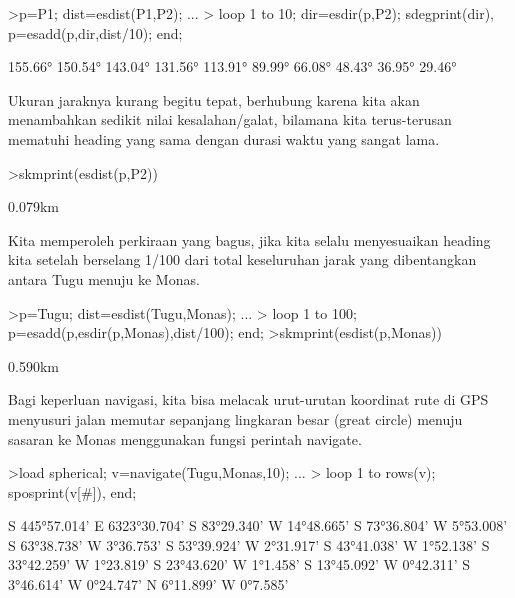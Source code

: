 \documentclass[a4paper,11pt,oneside,enabledeprecatedfontcommands]{scrbook}
\newenvironment{eulernotebook}{}{}
\newenvironment{eulercomment}{\par\medskip\noindent}{\par\medskip}
\begin{document}
\begin{eulernotebook}
\begin{eulerprompt}
\begin{eulercomment}
\end{eulercomment}
\begin{eulerprompt}
>p=P1;  dist=esdist(P1,P2); ...
>  loop 1 to 10; dir=esdir(p,P2); sdegprint(dir), p=esadd(p,dir,dist/10); end;
\end{eulerprompt}
\begin{euleroutput}
155.66°
150.54°
143.04°
131.56°
113.91°
 89.99°
 66.08°
 48.43°
 36.95°
 29.46°
\end{euleroutput}
\begin{eulercomment}
Ukuran jaraknya kurang begitu tepat, berhubung karena kita akan menambahkan sedikit nilai kesalahan/galat,
bilamana kita terus-terusan mematuhi heading yang sama dengan durasi waktu yang sangat lama.
\end{eulercomment}
\begin{eulerprompt}
>skmprint(esdist(p,P2))
\end{eulerprompt}
\begin{euleroutput}
0.079km
\end{euleroutput}
\begin{eulercomment}
Kita memperoleh perkiraan yang bagus, jika kita selalu menyesuaikan heading kita setelah berselang 1/100 dari total keseluruhan jarak
yang dibentangkan antara Tugu menuju ke Monas.
\end{eulercomment}
\begin{eulerprompt}
>p=Tugu; dist=esdist(Tugu,Monas); ...
>  loop 1 to 100; p=esadd(p,esdir(p,Monas),dist/100); end;
>skmprint(esdist(p,Monas))
\end{eulerprompt}
\begin{euleroutput}
0.590km
\end{euleroutput}
\begin{eulercomment}
Bagi keperluan navigasi, kita bisa melacak urut-urutan koordinat rute di GPS menyusuri jalan memutar sepanjang lingkaran besar (great circle)
menuju sasaran ke Monas menggunakan fungsi perintah navigate.
\end{eulercomment}
\begin{eulerprompt}
>load spherical; v=navigate(Tugu,Monas,10); ...
>  loop 1 to rows(v); sposprint(v[#]), end;
\end{eulerprompt}
\begin{euleroutput}
S 445°57.014' E 6323°30.704'
S 83°29.340' W 14°48.665'
S 73°36.804' W 5°53.008'
S 63°38.738' W 3°36.753'
S 53°39.924' W 2°31.917'
S 43°41.038' W 1°52.138'
S 33°42.259' W 1°23.819'
S 23°43.620' W 1°1.458'
S 13°45.092' W 0°42.311'
S 3°46.614' W 0°24.747'
N 6°11.899' W 0°7.585'

\end{euleroutput}
\end{eulerprompt}
\end{eulernotebook}
\end{document}
